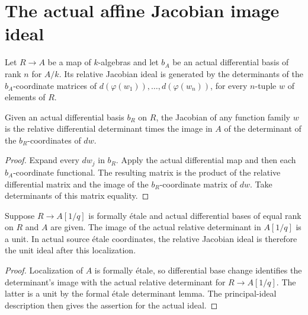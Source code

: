 \section{The actual affine Jacobian image ideal}

\begin{definition}\label{def:sc0-affine-relative-jacobian-ideal}
\leanok
Let $R\to A$ be a map of $k$-algebras and let $b_A$ be an actual differential
basis of rank $n$ for $A/k$. Its relative Jacobian ideal is generated by the
determinants of the $b_A$-coordinate matrices of
$d(\varphi(w_1)),\ldots,d(\varphi(w_n))$, for every $n$-tuple $w$ of elements of
$R$.
\end{definition}

\begin{lemma}\label{lem:sc0-function-jacobian-factorization}
\leanok
{}
Given an actual differential basis $b_R$ on $R$, the Jacobian of any function
family $w$ is the relative differential determinant times the image in $A$ of the
determinant of the $b_R$-coordinates of $dw$.
\end{lemma}
\begin{proof}
Expand every $dw_j$ in $b_R$. Apply the actual differential map and then each
$b_A$-coordinate functional. The resulting matrix is the product of the relative
differential matrix and the image of the $b_R$-coordinate matrix of $dw$. Take
determinants of this matrix equality.
\end{proof}

\begin{lemma}\label{lem:sc0-relative-jacobian-away-unit}
\leanok
{}
Suppose $R\to A[1/q]$ is formally \'etale and actual differential bases of equal
rank on $R$ and $A$ are given. The image of the actual relative determinant in
$A[1/q]$ is a unit. In actual source \'etale coordinates, the relative Jacobian
ideal is therefore the unit ideal after this localization.
\end{lemma}
\begin{proof}
Localization of $A$ is formally \'etale, so differential base change identifies
the determinant's image with the actual relative determinant for $R\to A[1/q]$.
The latter is a unit by the formal \'etale determinant lemma. The principal-ideal
description then gives the assertion for the actual ideal.
\end{proof}

